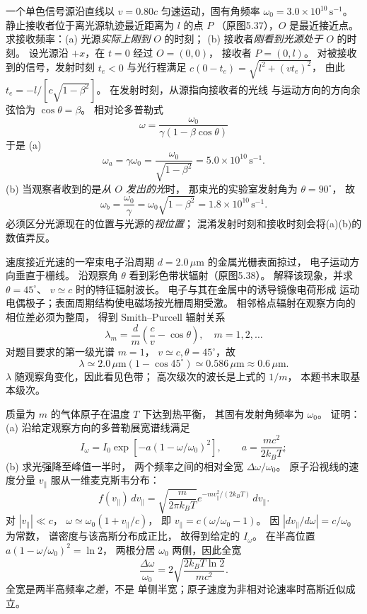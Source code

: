 一个单色信号源沿直线以
$v=0.80c$ 匀速运动，固有角频率
$\omega_0=3.0\times10^{10}\,\mathrm{s^{-1}}$。
静止接收者位于离光源轨迹最近距离为 $l$ 的点 $P$
（原图5.37），$O$ 是最近接近点。
求接收频率：(a) 光源\emph{实际上刚到} $O$ 的时刻；
(b) 接收者\emph{刚看到光源处于} $O$ 的时刻。
\exsolution
设光源沿 $+x$，在 $t=0$ 经过 $O=(0,0)$，
接收者 $P=(0,l)$。
对被接收到的信号，发射时刻
$t_e<0$ 与光行程满足
$c(0-t_e)=\sqrt{l^2+(vt_e)^2}$，
由此
$t_e=-l/[c\sqrt{1-\beta^2}]$。
在发射时刻，从源指向接收者的光线
与运动方向的方向余弦恰为 $\cos\theta=\beta$。
相对论多普勒式
\[
 \omega=\frac{\omega_0}{\gamma(1-\beta\cos\theta)}
\]
于是 (a)
\[
 \boxed{\omega_a=\gamma\omega_0
 =\frac{\omega_0}{\sqrt{1-\beta^2}}
 =5.0\times10^{10}\,\mathrm{s^{-1}}}.
\]
(b) 当观察者收到的是\emph{从 $O$ 发出的光}时，
那束光的实验室发射角为 $\theta=90^\circ$，
故
\[
 \boxed{\omega_b=\frac{\omega_0}{\gamma}
 =\omega_0\sqrt{1-\beta^2}
 =1.8\times10^{10}\,\mathrm{s^{-1}}}.
\]
\excheck 必须区分光源现在的位置与光源的\emph{视位置}；
混淆发射时刻和接收时刻会将(a)(b)的数值弄反。

速度接近光速的一窄束电子沿周期
$d=2.0\,\mu\mathrm m$ 的金属光栅表面掠过，
电子运动方向垂直于栅线。
沿观察角 $\theta$ 看到彩色带状辐射（原图5.38）。
解释该现象，并求 $\theta=45^\circ$、
$v\simeq c$ 时的特征辐射波长。
\exsolution
电子与其在金属中的诱导镜像电荷形成
运动电偶极子；表面周期结构使电磁场按光栅周期受激。
相邻格点辐射在观察方向的相位差必须为整周，
得到 Smith--Purcell 辐射关系
\[
 \boxed{\lambda_m=\frac d m
 \left(\frac c v-\cos\theta\right)},\quad
 m=1,2,\ldots
\]
对题目要求的第一级光谱 $m=1$，
$v\simeq c,\theta=45^\circ$，故
\[
 \boxed{\lambda\simeq
 2.0\,\mu\mathrm m(1-\cos45^\circ)
 \simeq0.586\,\mu\mathrm m\approx0.6\,\mu\mathrm m}.
\]
\excheck $\lambda$ 随观察角变化，因此看见色带；
高次级次的波长是上式的 $1/m$，
本题书末取基本级次。

质量为 $m$ 的气体原子在温度 $T$ 下达到热平衡，
其固有发射角频率为 $\omega_0$。
证明：(a) 沿给定观察方向的多普勒展宽谱线满足
\[
 I_\omega=I_0\exp[-a(1-\omega/\omega_0)^2],
 \qquad a=\frac{mc^2}{2k_BT};
\]
(b) 求光强降至峰值一半时，
两个频率之间的相对全宽 $\Delta\omega/\omega_0$。
\exsolution
原子沿视线的速度分量
$v_\parallel$ 服从一维麦克斯韦分布：
\[
 f(v_\parallel)\,dv_\parallel=
 \sqrt{\frac{m}{2\pi k_BT}}
 e^{-mv_\parallel^2/(2k_BT)}\,dv_\parallel.
\]
对 $|v_\parallel|\ll c$，
$\omega\simeq\omega_0(1+v_\parallel/c)$，
即 $v_\parallel=c(\omega/\omega_0-1)$。
因 $|dv_\parallel/d\omega|=c/\omega_0$ 为常数，
谱密度与该高斯分布成正比，
故得到给定的 $I_\omega$。
在半高位置
$a(1-\omega/\omega_0)^2=\ln2$，
两根分居 $\omega_0$ 两侧，因此全宽
\[
 \boxed{\frac{\Delta\omega}{\omega_0}
 =2\sqrt{\frac{2k_BT\ln2}{mc^2}}}.
\]
\excheck 全宽是两半高频率\emph{之差}，不是
单侧半宽；原子速度为非相对论速率时高斯近似成立。

